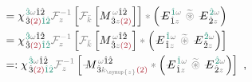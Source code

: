 \begin{subequations}
\begin{align}
	&= {\chi}^{\;\! \textcolor{PineGreen}{\hat{3}} \mathcolor{gray}{\omega} \hat{1} \hat{2} }_{\;\! \hat{3} \textcolor{Maroon}{(2)} \textcolor{PineGreen}{\hat{1} \hat{2}}} \mathcolor{gray}{\mathcal F_{z}^{-1}} \left[ \mathcolor{gray}{\mathcal F_{\bar{k}}} \left[ M^{\;\! \mathcolor{gray}{\omega} \hat{1} \hat{2} }_{\;\! \hat{3} \mathcolor{gray}{z} \textcolor{Maroon}{(2)} } \right] \right] \mathcolor{gray}{*} \left( \Xint{\mathcolor{gray}{-}}{295}{E}^{\;\!\textcolor{PineGreen}{\hat{1}} \mathcolor{gray}{\omega}}_{\;\! \hat{1} \mathcolor{gray}{z}} ~\mathcolor{gray}{\widetilde \circledast}~ \Xint{\mathcolor{gray}{-}}{295}{E}^{\;\!\textcolor{PineGreen}{\hat{2}} \mathcolor{gray}{\omega}}_{\;\! \hat{2} \mathcolor{gray}{z}} \right) \label{eq:DP^(2)-3_12-spectrum-C4} \\
	&= {\chi}^{\;\! \textcolor{PineGreen}{\hat{3}} \mathcolor{gray}{\omega} \hat{1} \hat{2} }_{\;\! \hat{3} \textcolor{Maroon}{(2)} \textcolor{PineGreen}{\hat{1} \hat{2}}} \mathcolor{gray}{\mathcal F_{z}^{-1}} \left[ \mathcolor{gray}{\mathcal F_{\bar{k}}} \left[ M^{\;\! \mathcolor{gray}{\omega} \hat{1} \hat{2} }_{\;\! \hat{3} \mathcolor{gray}{z} \textcolor{Maroon}{(2)} } \right] \mathcolor{gray}{*} \left( \Xint{\mathcolor{gray}{-}}{295}{E}^{\;\!\textcolor{PineGreen}{\hat{1}} \mathcolor{gray}{\omega}}_{\;\! \hat{1} \mathcolor{gray}{z}} ~\mathcolor{gray}{\widetilde \circledast}~ \Xint{\mathcolor{gray}{-}}{295}{E}^{\;\!\textcolor{PineGreen}{\hat{2}} \mathcolor{gray}{\omega}}_{\;\! \hat{2} \mathcolor{gray}{z}} \right) \right] \label{eq:DP^(2)-3_12-spectrum-C5} \\
	&=: {\chi}^{\;\! \textcolor{PineGreen}{\hat{3}} \mathcolor{gray}{\omega} \hat{1} \hat{2} }_{\;\! \hat{3} \textcolor{Maroon}{(2)} \textcolor{PineGreen}{\hat{1} \hat{2}}} \mathcolor{gray}{\mathcal F_{z}^{-1}} \left[ \Xint{\mathcolor{gray}{-}}{18}{M}^{\;\! \mathcolor{gray}{\omega} \hat{1} \hat{2} }_{\;\! \hat{3} \mathcolor{gray}{k_{\symup{z}}} \textcolor{Maroon}{(2)} } \mathcolor{gray}{*} \left( \Xint{\mathcolor{gray}{-}}{295}{E}^{\;\!\textcolor{PineGreen}{\hat{1}} \mathcolor{gray}{\omega}}_{\;\! \hat{1} \mathcolor{gray}{z}} ~\mathcolor{gray}{\widetilde \circledast}~ \Xint{\mathcolor{gray}{-}}{295}{E}^{\;\!\textcolor{PineGreen}{\hat{2}} \mathcolor{gray}{\omega}}_{\;\! \hat{2} \mathcolor{gray}{z}} \right) \right] ~, \label{eq:DP^(2)-3_12-spectrum-C6}
\end{align}
\end{subequations}
